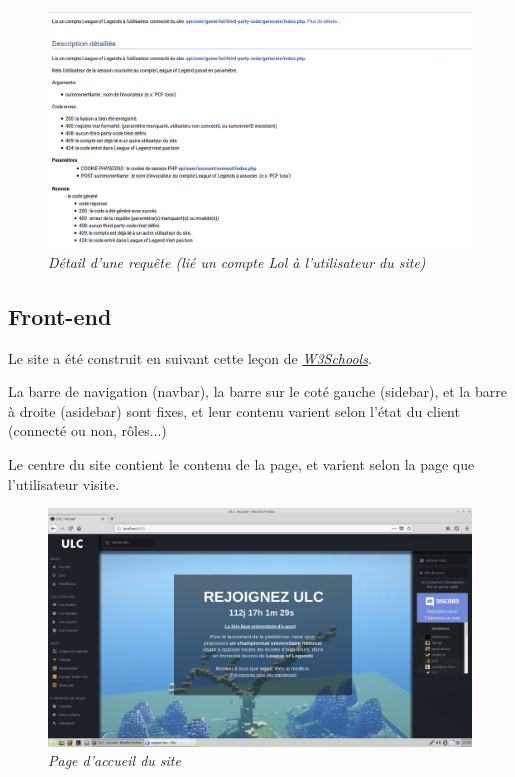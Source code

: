 \documentclass[10pt]{article}
\begin{document}
      \begin{figure}[H]
	\begin{center}
	  \includegraphics[width=14cm,keepaspectratio]{./images/link_account.png}
	\end{center}
	\caption{\textit{Détail d'une requête (lié un compte Lol à l'utilisateur du site)}}
	\label{link_account}
      \end{figure}

    \subsection{Front-end}
      Le site a été construit en suivant cette leçon de \href{https://www.w3schools.com/css/css_website_layout.asp}{\textit{W3Schools}}.
      
      La barre de navigation (navbar), la barre sur le coté gauche (sidebar), et la barre à droite (asidebar) sont fixes,
      et leur contenu varient selon l'état du client (connecté ou non, rôles...)
      
      Le centre du site contient le contenu de la page, et varient selon la page que l'utilisateur visite.
      
      \begin{figure}[H]
	\begin{center}
	  \includegraphics[width=16cm,keepaspectratio]{./images/site.png}
	\end{center}
	\caption{\textit{Page d'accueil du site}}
	\label{uml}
      \end{figure}
      
\end{document}
